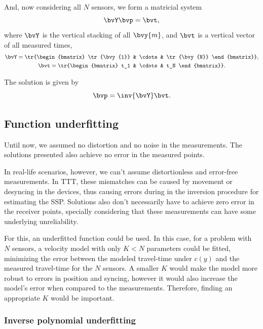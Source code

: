 And, now considering all $N$ sensors, we form a matricial system
\begin{equation}
	\bvY \bvp = \bvt,
\end{equation}
where $\bvY$ is the vertical stacking of all $\bvy{m}$, and $\bvt$ is a vertical vector of all measured times,
\begin{subequations}
	\begin{gather}
		\bvY = \tr{\begin{bmatrix}
				\tr{\bvy{1}} & \cdots & \tr{\bvy{N}}
		\end{bmatrix}}, \\
		\bvt = \tr{\begin{bmatrix}
				t_1 & \cdots & t_N
		\end{bmatrix}}.
	\end{gather}
\end{subequations}

The solution is given by
\begin{equation}
	\bvp = \inv{\bvY} \bvt.
\end{equation}

\subsection{Function underfitting}

Until now, we assumed no distortion and no noise in the measurements. The solutions presented also achieve no error in the measured points.

In real-life scenarios, however, we can't assume distortionless and error-free measurements. In TTT, these mismatches can be caused by movement or desyncing in the devices, thus causing errors during in the inversion procedure for estimating the SSP. Solutions also don't necessarily have to achieve zero error in the receiver points, specially considering that these measurements can have some underlying unreliability.

For this, an underfitted function could be used. In this case, for a problem with $N$ sensors, a velocity model with only $K < N$ parameters could be fitted, minimizing the error between the modeled travel-time under $c(y)$ and the measured travel-time for the $N$ sensors. A smaller $K$ would make the model more robust to errors in position and syncing, however it would also increase the model's error when compared to the measurements. Therefore, finding an appropriate $K$ would be important.

\subsubsection{Inverse polynomial underfitting}

